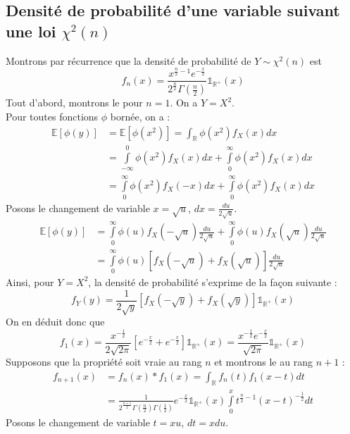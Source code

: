 \documentclass{report}
\begin{document}
		\subsection{Densité de probabilité d'une variable suivant une loi $\chi^2(n)$}
			Montrons par récurrence que la densité de probabilité de $Y \sim \chi^2(n)$ est
			\[ f_n(x) = \frac{x^{\frac{n}{2}-1}e^{-\frac{x}{2}}}{2^{\frac{n}{2}}\Gamma(\frac{n}{2})}\mathds{1}_\mathbb{R^+}(x) \]
			Tout d'abord, montrons le pour $n=1$. On a $Y=X^2$.\\
			Pour toutes fonctions $\phi$ bornée, on a :
			\begin{align*} 
				\mathbb{E}[\phi(y)] &= \mathbb{E}[\phi(x^2)] = \int_\mathbb{R} \phi(x^2)f_X(x)dx\\
				&= \int\limits_{-\infty}^{0} \phi(x^2)f_X(x)dx + \int\limits_0^{\infty} \phi(x^2)f_X(x)dx\\
				&= \int\limits_0^{\infty} \phi(x^2)f_X(-x)dx + \int\limits_0^{\infty} \phi(x^2)f_X(x)dx
			\end{align*}
			Posons le changement de variable $x=\sqrt{u}$, $dx=\frac{du}{2\sqrt u}$.
			\begin{align*} 
				\mathbb{E}[\phi(y)] &= \int\limits_0^{\infty} \phi(u)f_X(-\sqrt{u})\frac{du}{2\sqrt u} + \int\limits_0^{\infty} \phi(u)f_X(\sqrt{u})\frac{du}{2\sqrt u} \\
				&= \int\limits_0^{\infty} \phi(u)[f_X(-\sqrt{u}) + f_X(\sqrt{u})]\frac{du}{2\sqrt u}
			\end{align*}
			Ainsi, pour $Y=X^2$, la densité de probabilité s'exprime de la façon suivante :
			\[ f_Y(y) = \frac{1}{2\sqrt y}[f_X(-\sqrt{y}) + f_X(\sqrt{y})]\mathds{1}_\mathbb{R^+}(x) \]
			On en déduit donc que 
			\[ f_1(x) = \frac{x^{-\frac{1}{2}}}{2\sqrt{2\pi}}[e^{-\frac{x}{2}} + e^{-\frac{x}{2}}]\mathds{1}_\mathbb{R^+}(x) = \frac{x^{-\frac{1}{2}}e^{-\frac{x}{2}}}{\sqrt{2\pi}}\mathds{1}_\mathbb{R^+}(x) \]
			Supposons que la propriété soit vraie au rang $n$ et montrons le au rang $n+1$ :
			\begin{align*}
				f_{n+1}(x) &= f_{n}(x) \ast f_1(x) = \int_\mathbb{R} f_n(t)f_1(x-t)dt\\
				&= \frac{1}{2^{\frac{n+1}{2}}\Gamma(\frac{n}{2})\Gamma(\frac{1}{2})}e^{-\frac{x}{2}}\mathds{1}_\mathbb{R^+}(x)\int\limits_0^x t^{\frac{n}{2}-1}(x-t)^{-\frac{1}{2}}dt
			\end{align*}
			Posons le changement de variable $t = xu$, $dt = xdu$.
\end{document}
